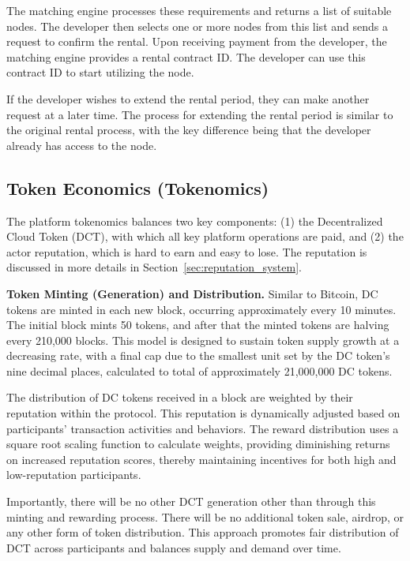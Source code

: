 The matching engine processes these requirements and returns a list of suitable nodes. The developer then selects one or more nodes from this list and sends a request to confirm the rental. Upon receiving payment from the developer, the matching engine provides a rental contract ID. The developer can use this contract ID to start utilizing the node.

If the developer wishes to extend the rental period, they can make another request at a later time. The process for extending the rental period is similar to the original rental process, with the key difference being that the developer already has access to the node.


\subsection{Token Economics (Tokenomics)}
\label{sec:token_economics}

The platform tokenomics balances two key components: (1) the Decentralized Cloud Token (DCT), with which all key platform operations are paid, and (2) the actor reputation, which is hard to earn and easy to lose. The reputation is discussed in more details in Section~\ref{sec:reputation_system}.

{\bf Token Minting (Generation) and Distribution.}
Similar to Bitcoin, DC tokens are minted in each new block, occurring approximately every 10 minutes. The initial block mints 50 tokens, and after that the minted tokens are halving every 210,000 blocks. This model is designed to sustain token supply growth at a decreasing rate, with a final cap due to the smallest unit set by the DC token's nine decimal places, calculated to total of approximately 21,000,000 DC tokens.

The distribution of DC tokens received in a block are weighted by their reputation within the protocol. This reputation is dynamically adjusted based on participants' transaction activities and behaviors. The reward distribution uses a square root scaling function to calculate weights, providing diminishing returns on increased reputation scores, thereby maintaining incentives for both high and low-reputation participants.

Importantly, there will be no other DCT generation other than through this minting and rewarding process. There will be no additional token sale, airdrop, or any other form of token distribution. This approach promotes fair distribution of DCT across participants and balances supply and demand over time.

